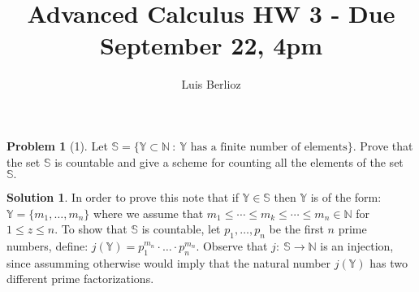 \documentclass{article}
\theoremstyle{definition}
\newtheorem*{soln}{Solution}
\newtheorem*{prob}{Problem}
\theoremstyle{theorem}
\newcommand{\N}{\mathbb{N}}
\renewcommand{\S}{\mathbb{S}}
\begin{document}
\title{Advanced Calculus HW 3 - Due September 22, 4pm}
\author{Luis Berlioz}
\maketitle



\begin{prob}[1]
Let $\S = \{ \mathbb{Y} \subset \N \ :\  \mathbb{Y} \text{ has a finite number of elements}\}.$ Prove that the set $\mathbb{S}$ is countable and give a scheme for counting all the elements of the set $\mathbb{S}.$
\end{prob}
\begin{soln}
    In order to prove this note that if $\mathbb{Y} \in \S$ then $\mathbb{Y} $ is of the form: $\mathbb{Y} =\{m_1,\ldots, m_n\}$ where we assume that  $m_1\leq \cdots \leq m_k\leq \cdots \leq m_n \in \N$ for $1\leq z\leq n$. To show that $\S$ is countable, let $p_1,\ldots,p_n$ be the first $n$ prime numbers, define: $j(\mathbb{Y} ) = p_1^{m_n}\cdot\ldots\cdot p_n^{m_n}$. Observe that $j:\ \S \to \N$ is an injection, since assumming otherwise would imply that the natural number $j(\mathbb{Y})$ has two different prime factorizations. 
\end{soln}
\vspace{1in}
\end{document}
